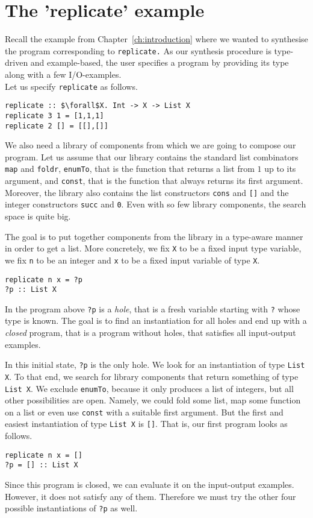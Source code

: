 \section{The 'replicate' example}

Recall the example from Chapter~\ref{ch:introduction} where we wanted to synthesise the program corresponding to \lstinline?replicate.? As our synthesis procedure is type-driven and example-based, the user specifies a program by providing its type along with a few I/O-examples.\\
Let us specify \lstinline?replicate? as follows.
\begin{lstlisting}[style=plain]
replicate :: $\forall$X. Int -> X -> List X
replicate 3 1 = [1,1,1]
replicate 2 [] = [[],[]]
\end{lstlisting}

We also need a library of components from which we are going to compose our program. Let us assume that our library contains the standard list combinators \lstinline?map? and \lstinline?foldr?, \lstinline?enumTo?, that is the function that returns a list from $1$ up to its argument, and \lstinline?const?, that is the function that always returns its first argument. Moreover, the library also contains the list constructors \lstinline?cons? and \lstinline?[]? and the integer constructors \lstinline?succ? and \lstinline?0?. Even with so few library components, the search space is quite big.

The goal is to put together components from the library in a type-aware manner in order to get a list. More concretely, we fix \lstinline?X? to be a fixed input type variable, we fix \lstinline?n? to be an integer and \lstinline?x? to be a fixed input variable of type \lstinline?X?.
\begin{lstlisting}[style=plain]
replicate n x = ?p
?p :: List X
\end{lstlisting}
In the program above \lstinline!?p! is a \emph{hole}, that is a fresh variable starting with \lstinline!?! whose type is known. The goal is to find an instantiation for all holes and end up with a \emph{closed} program, that is a program without holes, that satisfies all input-output examples.

In this initial state, \lstinline!?p! is the only hole. We look for an instantiation of type \lstinline!List X!. To that end, we search for library components that return something of type \lstinline?List X?. We exclude \lstinline?enumTo?, because it only produces a list of integers, but all other possibilities are open. Namely, we could fold some list, map some function on a list or even use \lstinline?const? with a suitable first argument. But the first and easiest instantiation of type \lstinline?List X? is \lstinline?[]?. That is, our first program looks as follows.
\begin{lstlisting}[style=plain]
replicate n x = []
?p = [] :: List X
\end{lstlisting}
Since this program is closed, we can evaluate it on the input-output examples. However, it does not satisfy any of them. Therefore we must try the other four possible instantiations of \lstinline!?p! as well.

